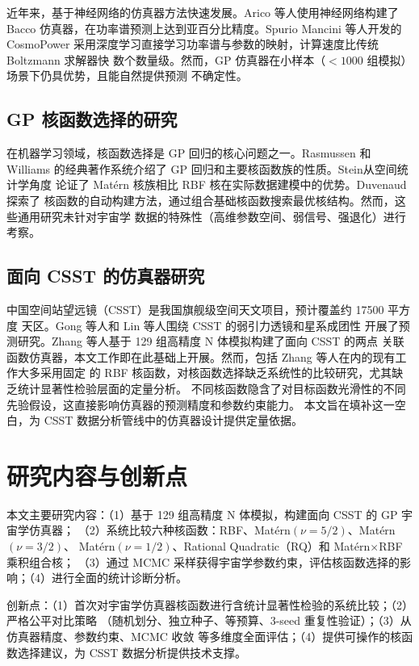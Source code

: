 近年来，基于神经网络的仿真器方法快速发展。Arico 等人\cite{Arico2021}使用神经网络构建了
Bacco 仿真器，在功率谱预测上达到亚百分比精度。Spurio Mancini 等人\cite{Mancini2022}开发的
CosmoPower 采用深度学习直接学习功率谱与参数的映射，计算速度比传统 Boltzmann 求解器快
数个数量级。然而，GP 仿真器在小样本（${<}1000$ 组模拟）场景下仍具优势，且能自然提供预测
不确定性。

\subsection{GP 核函数选择的研究}

在机器学习领域，核函数选择是 GP 回归的核心问题之一。Rasmussen 和 Williams\cite{Rasmussen2006}
的经典著作系统介绍了 GP 回归和主要核函数族的性质。Stein\cite{Stein1999}从空间统计学角度
论证了 Mat\'ern 核族相比 RBF 核在实际数据建模中的优势。Duvenaud\cite{Duvenaud2014}探索了
核函数的自动构建方法，通过组合基础核函数搜索最优核结构。然而，这些通用研究未针对宇宙学
数据的特殊性（高维参数空间、弱信号、强退化）进行考察。

\subsection{面向 CSST 的仿真器研究}

中国空间站望远镜（CSST）\cite{Zhan2011}是我国旗舰级空间天文项目，预计覆盖约 17500 平方度
天区。Gong 等人\cite{Gong2019}和 Lin 等人\cite{Lin2022}围绕 CSST 的弱引力透镜和星系成团性
开展了预测研究。Zhang 等人\cite{Zhang2023}基于 129 组高精度 N 体模拟构建了面向 CSST 的两点
关联函数仿真器，本文工作即在此基础上开展。然而，包括 Zhang 等人在内的现有工作大多采用固定
的 RBF 核函数，对核函数选择缺乏系统性的比较研究，尤其缺乏统计显著性检验层面的定量分析。
不同核函数隐含了对目标函数光滑性的不同先验假设，这直接影响仿真器的预测精度和参数约束能力。
本文旨在填补这一空白，为 CSST 数据分析管线中的仿真器设计提供定量依据。

\section{研究内容与创新点}\label{sec:contrib}

本文主要研究内容：（1）基于 129 组高精度 N 体模拟，构建面向 CSST 的 GP 宇宙学仿真器；
（2）系统比较六种核函数：RBF、Mat\'ern$(\nu=5/2)$、Mat\'ern$(\nu=3/2)$、
Mat\'ern$(\nu=1/2)$、Rational Quadratic（RQ）和 Mat\'ern$\times$RBF 乘积组合核；
（3）通过 MCMC 采样获得宇宙学参数约束，评估核函数选择的影响；（4）进行全面的统计诊断分析。

创新点：（1）首次对宇宙学仿真器核函数进行含统计显著性检验的系统比较；（2）严格公平对比策略
（随机划分、独立种子、等预算、3-seed 重复性验证）；（3）从仿真器精度、参数约束、MCMC 收敛
等多维度全面评估；（4）提供可操作的核函数选择建议，为 CSST 数据分析提供技术支撑。

